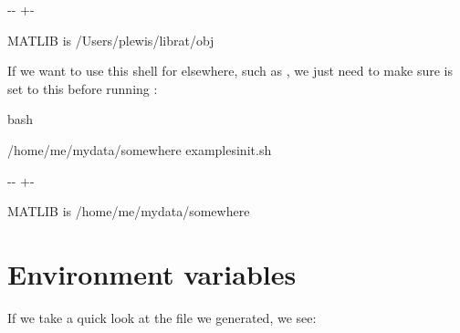 \documentclass[letterpaper,10pt,english]{sphinxmanual}
\newlength\nbsphinxcodecellspacing
\begin{document}
{

\kern-\sphinxverbatimsmallskipamount\kern-\baselineskip
\kern+\FrameHeightAdjust\kern-\fboxrule
\vspace{\nbsphinxcodecellspacing}

\begin{sphinxVerbatim}[commandchars=\\\{\}]
MATLIB is /Users/plewis/librat/obj
\end{sphinxVerbatim}
}

If we want to use this shell for  elsewhere, such as , we just need to make sure  is set to this before running :

{
\begin{sphinxVerbatim}[commandchars=\\\{\}]
\llap{\color{nbsphinxin}[7]:\,\hspace{\fboxrule}\hspace{\fboxsep}}\PYGZpc{}\PYGZpc{}bash

 /home/me/mydata/somewhere
 examples\PYGZus{}init.sh
 
\end{sphinxVerbatim}
}

{

\kern-\sphinxverbatimsmallskipamount\kern-\baselineskip
\kern+\FrameHeightAdjust\kern-\fboxrule
\vspace{\nbsphinxcodecellspacing}

\begin{sphinxVerbatim}[commandchars=\\\{\}]
MATLIB is /home/me/mydata/somewhere
\end{sphinxVerbatim}
}


\section{Environment variables}
\label{\detokenize{RATstart:Environment-variables}}
If we take a quick look at the  file we generated, we see:
\end{document}
